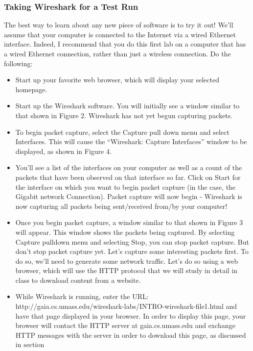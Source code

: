 \documentclass[11pt,a4paper]{article}
\begin{document}
\subsubsection{Taking Wireshark for a Test Run}
The best way to learn about any new piece of software is to try it out! We’ll assume that
your computer is connected to the Internet via a wired Ethernet interface. Indeed, I
recommend that you do this first lab on a computer that has a wired Ethernet connection,
rather than just a wireless connection. Do the following:

\begin{itemize}
    \item Start up your favorite web browser, which will display your selected homepage.
    \item Start up the Wireshark software. You will initially see a window similar to that
    shown in Figure 2. Wireshark has not yet begun capturing packets.
    \item To begin packet capture, select the Capture pull down menu and select Interfaces.
    This will cause the “Wireshark: Capture Interfaces” window to be displayed, as
    shown in Figure 4.
    \item You’ll see a list of the interfaces on your computer as well as a count of the
    packets that have been observed on that interface so far. Click on Start for the
    interface on which you want to begin packet capture (in the case, the Gigabit
    network Connection). Packet capture will now begin - Wireshark is now
    capturing all packets being sent/received from/by your computer!
    \item Once you begin packet capture, a window similar to that shown in Figure 3 will
    appear. This window shows the packets being captured. By selecting Capture
    pulldown menu and selecting Stop, you can stop packet capture. But don’t stop
    packet capture yet. Let’s capture some interesting packets first. To do so, we’ll
    need to generate some network traffic. Let’s do so using a web browser, which
    will use the HTTP protocol that we will study in detail in class to download
    content from a website.
    \item While Wireshark is running, enter the URL:
    http://gaia.cs.umass.edu/wireshark-labs/INTRO-wireshark-file1.html
    and have that page displayed in your browser. In order to display this page, your
    browser will contact the HTTP server at gaia.cs.umass.edu and exchange HTTP
    messages with the server in order to download this page, as discussed in section

\end{itemize}
\end{document}
